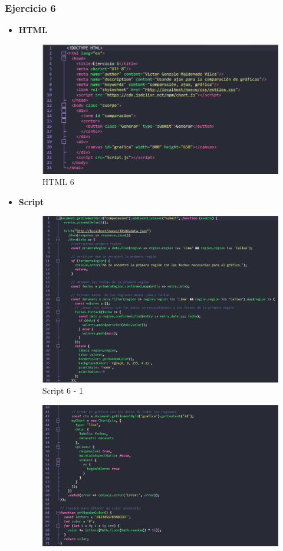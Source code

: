 \documentclass{article}
\begin{document}
	\subsubsection{Ejercicio 6}
	\begin{itemize}
		\item \textbf{HTML}
		\begin{figure}[H]
			\centering
			\includegraphics[width=1\textwidth,keepaspectratio]{img/html6.png}
			\caption{HTML 6}
		\end{figure}
		\newpage
		\item \textbf{Script}
		\begin{figure}[H]
			\centering
			\includegraphics[width=1\textwidth,keepaspectratio]{img/Script6-1.png}
			\caption{Script 6 - 1}
		\end{figure}
		\begin{figure}[H]
			\centering
			\includegraphics[width=1\textwidth,keepaspectratio]{img/Script6-2.png}

\end{figure}
\end{itemize}
\end{document}

